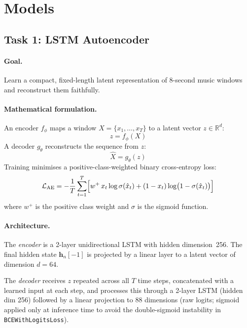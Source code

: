 \documentclass[letterpaper]{article}
\newcommand{\Lcal}{\mathcal{L}}
\begin{document}
\section{Models}
\label{sec:models}

\subsection{Task 1: LSTM Autoencoder}
\label{sec:task1}

\paragraph{Goal.}
Learn a compact, fixed-length latent representation of 8-second music
windows and reconstruct them faithfully.

\paragraph{Mathematical formulation.}
An encoder $f_\phi$ maps a window $X = \{x_1, \ldots, x_T\}$ to a latent
vector $z \in \mathbb{R}^d$:
\begin{equation}
  z = f_\phi(X)
\end{equation}
A decoder $g_\theta$ reconstructs the sequence from $z$:
\begin{equation}
  \hat{X} = g_\theta(z)
\end{equation}
Training minimises a positive-class-weighted binary cross-entropy loss:
\begin{equation}
  \Lcal_{\mathrm{AE}} = -\frac{1}{T}\sum_{t=1}^{T}\Bigl[
    w^{+}\,x_t\log\sigma(\hat{x}_t)
    + (1-x_t)\log\bigl(1-\sigma(\hat{x}_t)\bigr)
  \Bigr]
\end{equation}
where $w^{+}$ is the positive class weight and $\sigma$ is the sigmoid function.

\paragraph{Architecture.}
The \emph{encoder} is a 2-layer unidirectional LSTM with hidden
dimension~256.  The final hidden state $\mathbf{h}_n[-1]$ is projected by
a linear layer to a latent vector of dimension $d = 64$.

The \emph{decoder} receives $z$ repeated across all $T$ time steps,
concatenated with a learned input at each step, and processes this
through a 2-layer LSTM (hidden dim 256) followed by a linear projection
to 88 dimensions (raw logits; sigmoid applied only at inference time to
avoid the double-sigmoid instability in \texttt{BCEWithLogitsLoss}).
\end{document}
